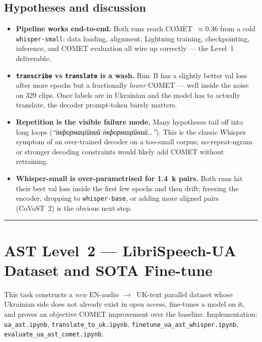 \documentclass[11pt]{article}
\newcommand{\sectionrule}{\vspace{0.5em}\noindent\rule{\textwidth}{0.4pt}\vspace{0.5em}}
\begin{document}
\subsection{Hypotheses and discussion}
\begin{itemize}
    \item \textbf{Pipeline works end-to-end.} Both runs reach COMET~$\approx
    0.36$ from a cold \texttt{whisper-small}: data loading, alignment,
    Lightning training, checkpointing, inference, and COMET evaluation all
    wire up correctly --- the Level~1 deliverable.
    \item \textbf{\texttt{transcribe} vs \texttt{translate} is a wash.} Run~B
    has a slightly better val loss after more epochs but a fractionally
    \emph{lower} COMET --- well inside the noise on 329 clips. Once labels are
    in Ukrainian and the model has to actually translate, the decoder
    prompt-token barely matters.
    \item \textbf{Repetition is the visible failure mode.} Many hypotheses
    tail off into long loops (\textit{``інформаційний інформаційний\dots''}).
    This is the classic Whisper symptom of an over-trained decoder on a
    too-small corpus; no-repeat-ngram or stronger decoding constraints would
    likely add COMET without retraining.
    \item \textbf{Whisper-small is over-parametrised for 1.4~k pairs.} Both
    runs hit their best val loss inside the first few epochs and then drift;
    freezing the encoder, dropping to \texttt{whisper-base}, or adding more
    aligned pairs (CoVoST~2) is the obvious next step.
\end{itemize}

\sectionrule

\section{AST Level~2 --- LibriSpeech-UA Dataset and SOTA Fine-tune}

This task constructs a \emph{new} EN-audio~$\rightarrow$~UK-text parallel
dataset whose Ukrainian side does not already exist in open access,
fine-tunes a model on it, and proves an objective COMET improvement over the
baseline. Implementation: \texttt{ua\_ast.ipynb},
\texttt{translate\_to\_uk.ipynb}, \texttt{finetune\_ua\_ast\_whisper.ipynb},
\texttt{evaluate\_ua\_ast\_comet.ipynb}.
\end{document}
